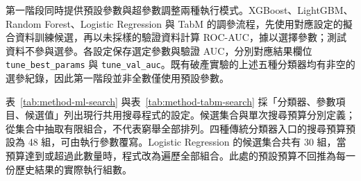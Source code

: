 第一階段同時提供預設參數與超參數調整兩種執行模式。XGBoost、LightGBM、Random Forest、Logistic Regression 與 TabM 的調參流程，先使用對應設定的擬合資料訓練候選，再以未採樣的驗證資料計算 ROC-AUC，據以選擇參數；測試資料不參與選參。各設定保存選定參數與驗證 AUC，分別對應結果欄位 \nolinkurl{tune_best_params} 與 \nolinkurl{tune_val_auc}。既有破產實驗的上述五種分類器均有非空的選參紀錄，因此第一階段並非全數僅使用預設參數。

表~\ref{tab:method-ml-search} 與表~\ref{tab:method-tabm-search} 採「分類器、參數項目、候選值」列出現行共用搜尋程式的設定。候選集合與單次搜尋預算分別定義；從集合中抽取有限組合，不代表窮舉全部排列。四種傳統分類器入口的搜尋預算預設為 48 組，可由執行參數覆寫。Logistic Regression 的候選集合共有 30 組，當預算達到或超過此數量時，程式改為遍歷全部組合。此處的預設預算不回推為每一份歷史結果的實際執行組數。

